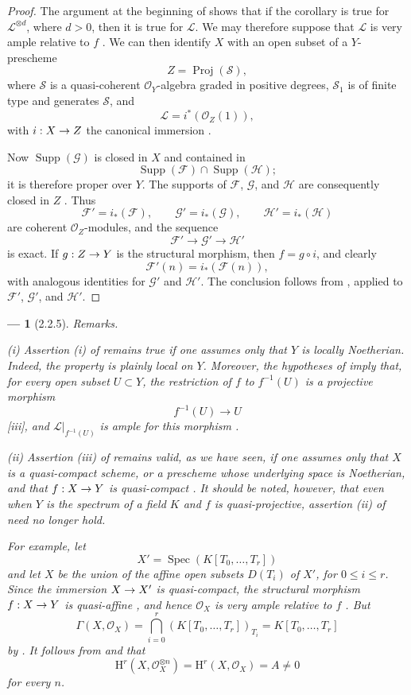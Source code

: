 \documentclass[oneside]{amsart}
\theoremstyle{ega-env-style}
\newtheorem*{env}{---}
\theoremstyle{ega-thm-env-style}
\theoremstyle{ega-defn-env-style}
\def\mathcal{\mathscr}
\def\sh{\mathcal}                   %
\def\leq{\leqslant}                 %
\def\HH{\mathrm{H}}                 %
\def\Proj{\operatorname{Proj}}
\def\Supp{\operatorname{Supp}}
\def\Spec{\operatorname{Spec}}
\renewcommand{\to}{\mathchoice{\longrightarrow}{\rightarrow}{\rightarrow}{\rightarrow}}
\let\EGAOriginalLabel\label
\renewcommand{\label}[1]{\phantomsection\EGAOriginalLabel{#1}}
\begin{document}
\begin{proof}
The argument at the beginning of  shows that if the corollary is true for $\sh{L}^{\otimes d}$, where $d>0$, then it is true for $\sh{L}$.
We may therefore suppose that $\sh{L}$ is very ample relative to $f$ .
We can then identify $X$ with an open subset of a $Y$-prescheme
\[
  Z=\Proj(\sh{S}),
\]
where $\sh{S}$ is a quasi-coherent $\sh{O}_Y$-algebra graded in positive degrees, $\sh{S}_1$ is of finite type and generates $\sh{S}$, and
\[
  \sh{L}=i^*(\sh{O}_Z(1)),
\]
with $i:X\to Z$ the canonical immersion .

Now $\Supp(\sh{G})$ is closed in $X$ and contained in
\[
  \Supp(\sh{F})\cap\Supp(\sh{H});
\]
it is therefore proper over $Y$.
The supports of $\sh{F}$, $\sh{G}$, and $\sh{H}$ are consequently closed in $Z$ .
Thus
\[
  \sh{F}'=i_*(\sh{F}),\qquad
  \sh{G}'=i_*(\sh{G}),\qquad
  \sh{H}'=i_*(\sh{H})
\]
are coherent $\sh{O}_Z$-modules, and the sequence
\[
  \sh{F}'\longrightarrow\sh{G}'\longrightarrow\sh{H}'
\]
is exact.
If $g:Z\to Y$ is the structural morphism, then $f=g\circ i$, and clearly
\[
  \sh{F}'(n)=i_*(\sh{F}(n)),
\]
with analogous identities for $\sh{G}'$ and $\sh{H}'$.
The conclusion follows from , applied to $\sh{F}'$, $\sh{G}'$, and $\sh{H}'$.
\end{proof}

\begin{env}[2.2.5]
\label{III.2.2.5}
\emph{Remarks.}

(i) Assertion (i) of  remains true if one assumes only that $Y$ is \emph{locally Noetherian}.
Indeed, the property is plainly local on $Y$.
Moreover, the hypotheses of  imply that, for every open subset $U\subset Y$, the restriction of $f$ to $f^{-1}(U)$ is a projective morphism
\[
  f^{-1}(U)\longrightarrow U
\]
[iii], and $\sh{L}|_{f^{-1}(U)}$ is ample for this morphism .

(ii) Assertion (iii) of  remains valid, as we have seen, if one assumes only that $X$ is a quasi-compact scheme, or a prescheme whose underlying space is Noetherian, and that $f:X\to Y$ is quasi-compact .
It should be noted, however, that even when $Y$ is the \emph{spectrum of a field} $K$ and $f$ is \emph{quasi-projective}, assertion (ii) of  need no longer hold.

For example, let
\[
  X'=\Spec(K[T_0,\ldots,T_r])
\]
and let $X$ be the union of the affine open subsets $D(T_i)$ of $X'$, for $0\leq i\leq r$.
Since the immersion $X\to X'$ is quasi-compact, the structural morphism $f:X\to Y$ is quasi-affine , and hence $\sh{O}_X$ is very ample relative to $f$ .
But
\[
  \Gamma(X,\sh{O}_X)
  =\bigcap_{i=0}^r(K[T_0,\ldots,T_r])_{T_i}
  =K[T_0,\ldots,T_r]
\]
by .
It follows from  and  that
\[
  \HH^r(X,\sh{O}_X^{\otimes n})
  =\HH^r(X,\sh{O}_X)=A
  \neq0
\]
for every $n$.
\end{env}
\end{document}
